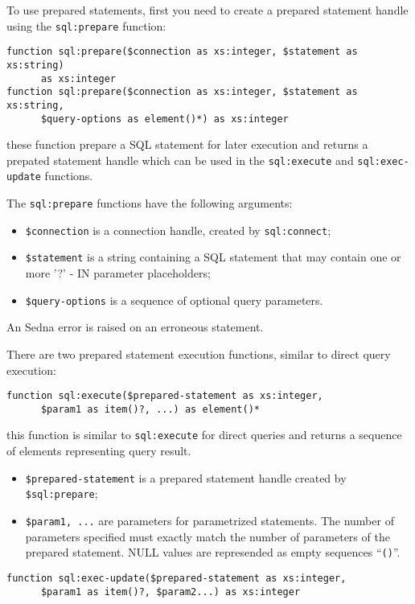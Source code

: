 \documentclass[a4paper,12pt]{article}
\begin{document}
To use prepared statements, first you need to create a prepared statement handle
using the \verb!sql:prepare! function:
\begin{verbatim}
function sql:prepare($connection as xs:integer, $statement as xs:string)
      as xs:integer
function sql:prepare($connection as xs:integer, $statement as xs:string,
      $query-options as element()*) as xs:integer
\end{verbatim}
these function prepare a SQL statement for later execution and returns a
prepated statement handle which can be used in
the \verb!sql:execute! and \verb!sql:exec-update! functions.

The \verb!sql:prepare! functions have the following arguments:
\begin{itemize}
\item \verb!$connection! is a connection handle, created by \verb!sql:connect!;
\item \verb!$statement! is a string containing a SQL statement that may
contain one or more '?' - IN parameter placeholders;
\item \verb!$query-options! is a sequence of optional query parameters.
\end{itemize}
An Sedna error is raised on an erroneous statement.

There are two prepared statement execution functions, similar to direct query
execution:

\begin{verbatim}
function sql:execute($prepared-statement as xs:integer,
      $param1 as item()?, ...) as element()*
\end{verbatim}
this function is similar to \verb!sql:execute! for direct queries and
returns a sequence of elements representing query result.
\begin{itemize}
\item \verb!$prepared-statement! is a prepared statement handle created by
\verb!$sql:prepare!;
\item \verb!$param1, ...! are parameters for parametrized
statements. The number of parameters specified must exactly match the number
of parameters of the prepared statement. NULL values are represended as empty
sequences ``\verb!()!''.
\end{itemize}

\begin{verbatim}
function sql:exec-update($prepared-statement as xs:integer,
      $param1 as item()?, $param2...) as xs:integer
\end{verbatim}
\end{document}
